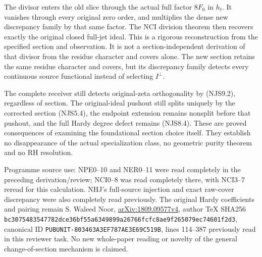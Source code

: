 The divisor enters the old slice through the actual full factor \(8F_0\)
in \(h_t\). It vanishes through every original zero order, and
multiplies the dense new discrepancy family by that same factor. The NCI
division theorem then recovers exactly the original closed full-jet
ideal. This is a rigorous reconstruction from the specified section and
observation. It is not a section-independent derivation of that divisor
from the residue character and covers alone. The new section retains the
same residue character and covers, but its discrepancy family detects
every continuous source functional instead of selecting \(I^\perp\).

The complete receiver still detects original-zeta orthogonality by
(NJS9.2), regardless of section. The original-ideal pushout still splits
uniquely by the corrected section (NJS5.4), the endpoint extension
remains nonsplit before that pushout, and the full Hardy degree defect
remains (NJS8.4). These are proved consequences of examining the
foundational section choice itself. They establish no disappearance of
the actual specialization class, no geometric purity theorem and no RH
resolution.

Programme source use: NPE0--10 and NER0--11 were read completely in the
preceding derivation/review; NCI0--8 was read completely there, with
NCI3--7 reread for this calculation. NHJ's full-source injection and
exact raw-cover discrepancy were also completely read previously. The
original Hardy coefficients and pairing remain S. Waleed Noor,
\href{https://arxiv.org/abs/1809.09577v4}{arXiv:1809.09577v4}, author
TeX SHA256
\nolinkurl{bc3075483547782dce36bf55a6349899a26766fcfc8ae9f265079ec74601f2d3},
canonical ID \nolinkurl{PUBUNIT-803463A3EF787AE3E69C519B}, lines
114--387 previously read in this reviewer task. No new whole-paper
reading or novelty of the general change-of-section mechanism is
claimed.
